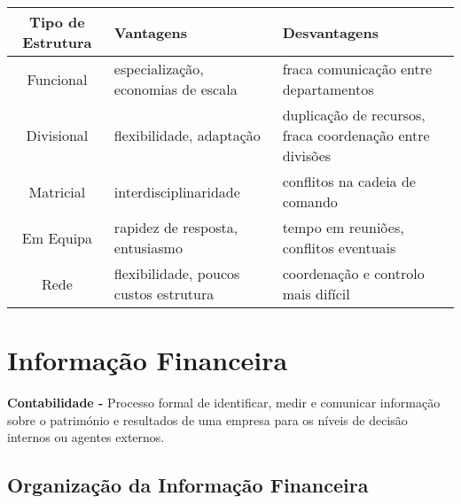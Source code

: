 \documentclass[11pt]{article}
\begin{document}
\begin{tabular}[t]{ | c | p{100pt} | p{150pt} | }
    \hline
    Tipo de Estrutura & Vantagens                              & Desvantagens                                             \\\hline
    Funcional         & especialização, economias de escala    & fraca comunicação entre departamentos                    \\\hline
    Divisional        & flexibilidade, adaptação               & duplicação de recursos, fraca coordenação entre divisões \\\hline
    Matricial         & interdisciplinaridade                  & conflitos na cadeia de comando                           \\\hline
    Em Equipa         & rapidez de resposta, entusiasmo        & tempo em reuniões, conflitos eventuais                   \\\hline
    Rede              & flexibilidade, poucos custos estrutura & coordenação e controlo mais difícil                      \\\hline
\end{tabular}

\newpage

\section{Informação Financeira}

\textbf{Contabilidade -} Processo formal de identificar, medir e comunicar informação sobre o património e resultados de uma empresa para os níveis de decisão internos ou agentes externos.

\subsection{Organização da Informação Financeira}
\end{document}
